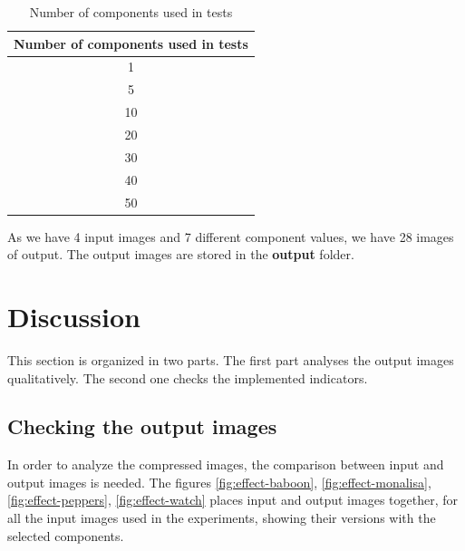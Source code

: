 \documentclass[]{IEEEtran}
\begin{document}
\begin{table}[h!]
  \centering
  \begin{center}
  \begin{tabular}{ |c| } 
   \hline
   Number of components used in tests \\
   \hline
    1\\ 
   \hline
    5\\
   \hline
    10\\ 
   \hline
    20\\
   \hline
    30\\
   \hline
    40 \\ 
   \hline
   50 \\
   \hline
  \end{tabular}
  \caption{Number of components used in tests}
  \label{table:components}
  \end{center}
  \end{table}

As we have 4 input images and 7 different component values, we have 28 images of output. The output images are stored in the \textbf{output} folder.

\section{Discussion}
This section is organized in two parts. The first part analyses the output images qualitatively. The second one checks the implemented indicators.

\subsection{Checking the output images}
In order to analyze the compressed images, the comparison between input and output images is needed. The figures \ref{fig:effect-baboon}, \ref{fig:effect-monalisa}, \ref{fig:effect-peppers}, \ref{fig:effect-watch} places input and output images together, for all the input images used in the experiments, showing their versions with the selected components. 
\end{document}

